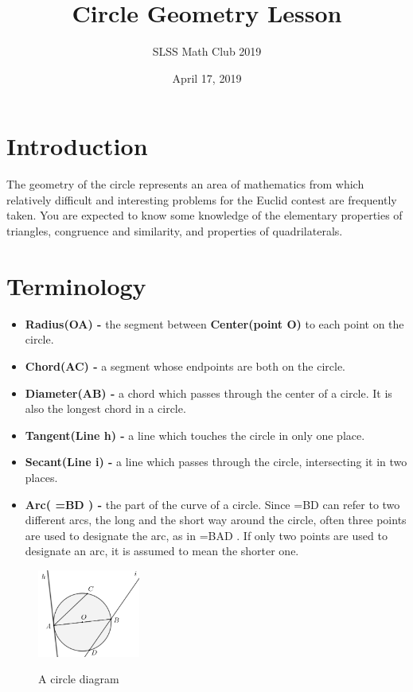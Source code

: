 \documentclass[12pt]{article}
\title{Circle Geometry Lesson\vspace{-3mm}}
\author{SLSS Math Club 2019\vspace{-5mm}}
\date{April 17, 2019\vspace{-5mm}}
\newcommand{\arc}[1]{{%
		\setbox9=\hbox{#1}%
		\ooalign{\resizebox{\wd9}{\height}{\texttoptiebar{\phantom{A}}}\cr#1}}}
\begin{document}
\maketitle
\section{Introduction}
The geometry of the circle represents an area of mathematics from which relatively
difficult and interesting problems for the Euclid contest are frequently taken. You are expected to know some knowledge of the elementary properties of triangles, congruence and similarity, and properties of quadrilaterals.
\section{Terminology}

\begin{itemize}
	\item \textbf{Radius(OA) - } the segment between \textbf{Center(point O)} to each point on the circle. 
	\item \textbf{Chord(AC) - } a segment whose endpoints are both on the circle. 
	\item \textbf{Diameter(AB) - } a chord which passes through the center of a circle. It is also the longest chord in a circle. 
	\item \textbf{Tangent(Line h) - } a line which touches the circle in only one place. 
	\item \textbf{Secant(Line i) - } a line which passes through the circle, intersecting it in two places.
	\item \textbf{Arc(\arc{BD}) - } the part of the curve of a circle. Since \arc{BD} can refer to two different arcs, the long and the short way around the circle, often three points are used to designate the arc, as in \arc{BAD}. 
	If only two points are used to designate an arc, it is assumed to mean the shorter one. 
\end{itemize}
\begin{figure}[h!]
\centering
\includegraphics[width=0.3\textwidth]{Graphics/Week_13/GeometryDiagram.png}
\label{fig: 2.1}
\caption{A circle diagram}
\end{figure}
\end{document}
